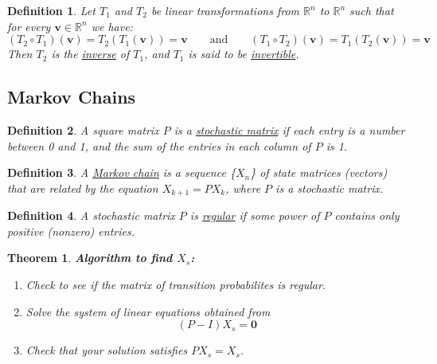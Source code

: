 \documentclass{article}
\theoremstyle{definitionstyle}
\newtheorem{definition}{Definition}[section]
\newtheorem{theorem}{Theorem}[section]
\begin{document}
\begin{definition}
    Let $T_1$ and $T_2$ be linear transformations from $\mathbb{R}^n$ to $\mathbb{R}^n$ such that for every $\mathbf{v} \in \mathbb{R}^n$
    we have:
    \begin{equation*}
        (T_2 \circ T_1)(\mathbf{v}) = T_2(T_1(\mathbf{v}))=\mathbf{v} \qquad \mathrm{and} \qquad (T_1 \circ T_2)(\mathbf{v}) = T_1(T_2(\mathbf{v}))=\mathbf{v}
    \end{equation*}
    Then $T_2$ is the \underline{inverse} of $T_1$, and $T_1$ is said to be \underline{invertible}.
\end{definition}

\subsection{Markov Chains}

\begin{definition}
    A square matrix $P$ is a \underline{stochastic matrix} if each entry is a number between 0 and 1, and the sum of the
    entries in each column of $P$ is 1.
\end{definition}

\begin{definition}
    A \underline{Markov chain} is a sequence \{$X_n$\} of state matrices (vectors) that are related by the equation
    $X_{k+1} = PX_k$, where $P$ is a stochastic matrix.
\end{definition}

\begin{definition}
    A stochastic matrix $P$ is \underline{regular} if some power of $P$ contains only positive (nonzero) entries.
\end{definition}

\begin{theorem}
    \textbf{Algorithm to find $X_s$:}
    \begin{enumerate}
        \item Check to see if the matrix of transition probabilites is regular.
        \item Solve the system of linear equations obtained from
        \begin{equation*}
            (P-I)X_s=\mathbf{0}
        \end{equation*}
        \item Check that your solution satisfies $PX_s=X_s$.
    \end{enumerate}
\end{theorem}
\end{document}
